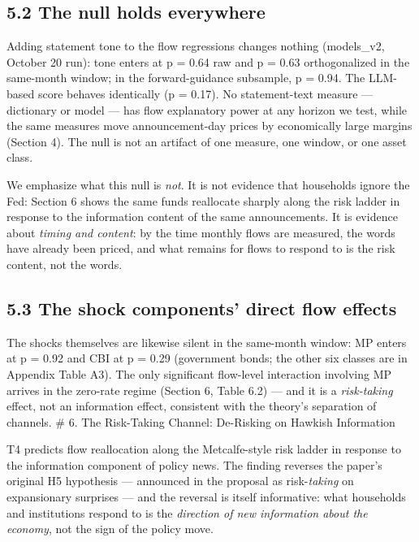 \subsection{5.2 The null holds everywhere}\label{the-null-holds-everywhere}

Adding statement tone to the flow regressions changes nothing (models\_v2, October 20 run): tone enters at p = 0.64 raw and p = 0.63 orthogonalized in the same-month window; in the forward-guidance subsample, p = 0.94. The LLM-based score behaves identically (p = 0.17). No statement-text measure --- dictionary or model --- has flow explanatory power at any horizon we test, while the same measures move announcement-day prices by economically large margins (Section 4). The null is not an artifact of one measure, one window, or one asset class.

We emphasize what this null is \emph{not}. It is not evidence that households ignore the Fed: Section 6 shows the same funds reallocate sharply along the risk ladder in response to the information content of the same announcements. It is evidence about \emph{timing and content}: by the time monthly flows are measured, the words have already been priced, and what remains for flows to respond to is the risk content, not the words.

\subsection{5.3 The shock components' direct flow effects}\label{the-shock-components-direct-flow-effects}

The shocks themselves are likewise silent in the same-month window: MP enters at p = 0.92 and CBI at p = 0.29 (government bonds; the other six classes are in Appendix Table A3). The only significant flow-level interaction involving MP arrives in the zero-rate regime (Section 6, Table 6.2) --- and it is a \emph{risk-taking} effect, not an information effect, consistent with the theory's separation of channels. \# 6. The Risk-Taking Channel: De-Risking on Hawkish Information

T4 predicts flow reallocation along the Metcalfe-style risk ladder in response to the information component of policy news. The finding reverses the paper's original H5 hypothesis --- announced in the proposal as risk-\emph{taking} on expansionary surprises --- and the reversal is itself informative: what households and institutions respond to is the \emph{direction of new information about the economy}, not the sign of the policy move.

